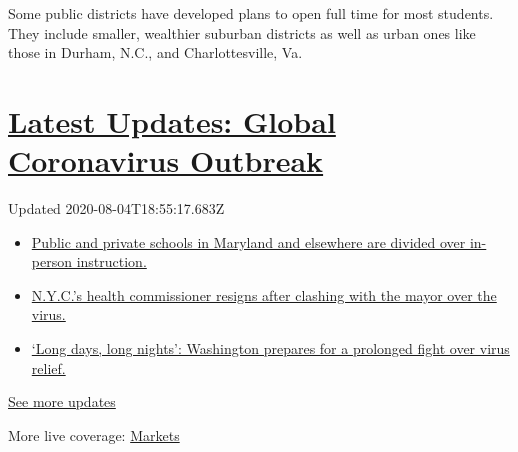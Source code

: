 Some public districts have developed plans to open full time for most
students. They include smaller, wealthier suburban districts as well as
urban ones like those in Durham, N.C., and Charlottesville, Va.

\hypertarget{latest-updates-global-coronavirus-outbreak}{%
\section{\texorpdfstring{\href{https://www.nytimes3xbfgragh.onion/2020/08/04/world/coronavirus-cases.html?action=click\&pgtype=Article\&state=default\&region=MAIN_CONTENT_1\&context=storylines_live_updates}{Latest
Updates: Global Coronavirus
Outbreak}}{Latest Updates: Global Coronavirus Outbreak}}\label{latest-updates-global-coronavirus-outbreak}}

Updated 2020-08-04T18:55:17.683Z

\begin{itemize}
\tightlist
\item
  \href{https://www.nytimes3xbfgragh.onion/2020/08/04/world/coronavirus-cases.html?action=click\&pgtype=Article\&state=default\&region=MAIN_CONTENT_1\&context=storylines_live_updates\#link-4825b93}{Public
  and private schools in Maryland and elsewhere are divided over
  in-person instruction.}
\item
  \href{https://www.nytimes3xbfgragh.onion/2020/08/04/world/coronavirus-cases.html?action=click\&pgtype=Article\&state=default\&region=MAIN_CONTENT_1\&context=storylines_live_updates\#link-4d1eafa8}{N.Y.C.'s
  health commissioner resigns after clashing with the mayor over the
  virus.}
\item
  \href{https://www.nytimes3xbfgragh.onion/2020/08/04/world/coronavirus-cases.html?action=click\&pgtype=Article\&state=default\&region=MAIN_CONTENT_1\&context=storylines_live_updates\#link-6b644638}{`Long
  days, long nights': Washington prepares for a prolonged fight over
  virus relief.}
\end{itemize}

\href{https://www.nytimes3xbfgragh.onion/2020/08/04/world/coronavirus-cases.html?action=click\&pgtype=Article\&state=default\&region=MAIN_CONTENT_1\&context=storylines_live_updates}{See
more updates}

More live coverage:
\href{https://www.nytimes3xbfgragh.onion/live/2020/08/04/business/stock-market-today-coronavirus?action=click\&pgtype=Article\&state=default\&region=MAIN_CONTENT_1\&context=storylines_live_updates}{Markets}

